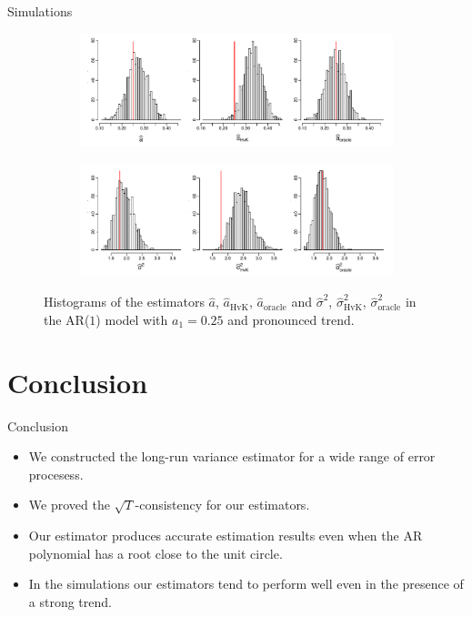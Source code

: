\documentclass[10pt]{beamer}
\begin{document}
\begin{frame}{Simulations}


\begin{figure}[t!]
\centering
\begin{subfigure}[b]{0.8\textwidth}
\includegraphics[width=\textwidth]{a_hat_histograms_a1=25_T=500_slope=10_(q,r,M1,M2)=(25,10,20,30).pdf}
\end{subfigure}
\begin{subfigure}[b]{0.8\textwidth}
\includegraphics[width=\textwidth]{lrv_histograms_a1=25_T=500_slope=10_(q,r,M1,M2)=(25,10,20,30).pdf}
\end{subfigure}
\caption{Histograms of the estimators $\widehat{a}$, $\widehat{a}_{\text{HvK}}$, $\widehat{a}_{\text{oracle}}$ and $\widehat{\sigma}^2$, $\widehat{\sigma}^2_{\text{HvK}}$, $\widehat{\sigma}^2_{\text{oracle}}$ in the AR($1$) model with $a_1 = 0.25$ and pronounced trend.}\label{fig:hist_scenario2} 
\end{figure}

\end{frame}


\section{Conclusion}
\begin{frame}{Conclusion}
\begin{itemize}
\item We constructed the long-run variance estimator for a wide range of error procesess.
\item We proved the $\sqrt{T}$-consistency for our estimators.
\item Our estimator produces accurate estimation results even when the AR polynomial has a root close to the unit circle.
\item In the simulations our estimators tend to perform well even in the presence of a strong trend.
\end{itemize}
\end{frame}
\end{document}
